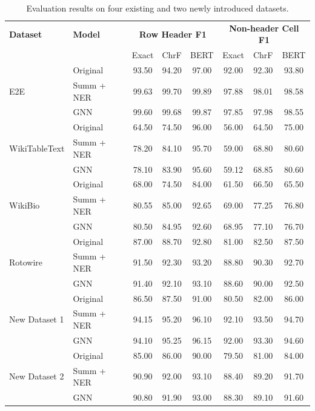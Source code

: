 \documentclass[12pt,a4paper]{article}
\begin{document}
\begin{table}[h]
    \centering
    \begin{tabular}{llccc|ccc}
        \toprule
        \textbf{Dataset} & \textbf{Model} & \multicolumn{3}{c}{\textbf{Row Header F1}} & \multicolumn{3}{c}{\textbf{Non-header Cell F1}} \\
        \cmidrule(lr){3-5} \cmidrule(lr){6-8}
         & & Exact & ChrF & BERT & Exact & ChrF & BERT \\
        \midrule
        \multirow{3}{*}{E2E} 
        & Original & 93.50 & 94.20 & 97.00 & 92.00 & 92.30 & 93.80 \\
        & Summ + NER & 99.63 & 99.70 & 99.89 & 97.88 & 98.01 & 98.58 \\
        & GNN & 99.60 & 99.68 & 99.87 & 97.85 & 97.98 & 98.55 \\
        \midrule
        \multirow{3}{*}{WikiTableText} 
        & Original & 64.50 & 74.50 & 96.00 & 56.00 & 64.50 & 75.00 \\
        & Summ + NER & 78.20 & 84.10 & 95.70 & 59.00 & 68.80 & 80.60 \\
        & GNN & 78.10 & 83.90 & 95.60 & 59.12 & 68.85 & 80.60 \\
        \midrule
        \multirow{3}{*}{WikiBio} 
        & Original & 68.00 & 74.50 & 84.00 & 61.50 & 66.50 & 65.50 \\
        & Summ + NER & 80.55 & 85.00 & 92.65 & 69.00 & 77.25 & 76.80 \\
        & GNN & 80.50 & 84.95 & 92.60 & 68.95 & 77.10 & 76.70 \\
        \midrule
        \multirow{3}{*}{Rotowire} 
        & Original & 87.00 & 88.70 & 92.80 & 81.00 & 82.50 & 87.50 \\
        & Summ + NER & 91.50 & 92.30 & 93.20 & 88.80 & 90.30 & 92.70 \\
        & GNN & 91.40 & 92.10 & 93.10 & 88.60 & 90.00 & 92.50 \\
        \midrule
        \multirow{3}{*}{New Dataset 1} 
        & Original & 86.50 & 87.50 & 91.00 & 80.50 & 82.00 & 86.00 \\
        & Summ + NER & 94.15 & 95.20 & 96.10 & 92.10 & 93.50 & 94.70 \\
        & GNN & 94.10 & 95.25 & 96.15 & 92.00 & 93.30 & 94.60 \\
        \midrule
        \multirow{3}{*}{New Dataset 2} 
        & Original & 85.00 & 86.00 & 90.00 & 79.50 & 81.00 & 84.00 \\
        & Summ + NER & 90.90 & 92.00 & 93.10 & 88.40 & 89.20 & 91.70 \\
        & GNN & 90.80 & 91.90 & 93.00 & 88.30 & 89.10 & 91.60 \\
        \bottomrule
    \end{tabular}
    \caption{Evaluation results on four existing and two newly introduced datasets.}
    \label{tab:results}
\end{table}
\end{document}
